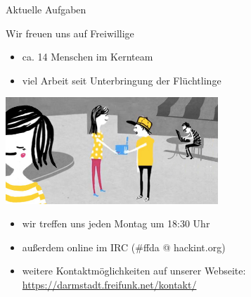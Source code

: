 \documentclass[10pt]{beamer}
\begin{document}
\begin{frame}{Aktuelle Aufgaben}
    \end{frame}

    \begin{frame}{Wir freuen uns auf Freiwillige}
      \begin{itemize}
        \item ca. 14 Menschen im Kernteam
        \item viel Arbeit seit Unterbringung der Flüchtlinge
      \end{itemize}
      \vfill
      \hspace{2em}\includegraphics[width=0.6\textwidth]{images/router}
      \vfill
      \begin{itemize}
        \pause
        \item wir treffen uns jeden Montag um 18:30 Uhr
        \item außerdem online im IRC (\#ffda @ hackint.org)
        \item weitere Kontaktmöglichkeiten auf unserer Webseite:\\
        \url{https://darmstadt.freifunk.net/kontakt/}
      \end{itemize}
    \end{frame}
\end{document}
